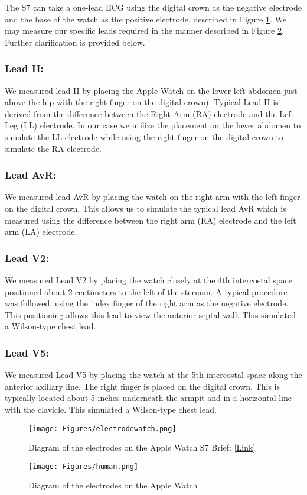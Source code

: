 \documentclass[
	a4paper, 
	10pt, 
	twoside, 
]{LTJournalArticle}
\begin{document}
The S7 can take a one-lead ECG using the digital crown as the negative electrode and the base of the watch as the positive electrode, described in Figure \ref{fig:s7watch}. We may measure our specific leads required in the manner described in Figure \ref{fig:human}. Further clarification is provided below. 

\subsubsection{Lead II:}We measured lead II by placing the Apple Watch on the lower left abdomen just above the hip with the right finger on the digital crown). Typical Lead II is derived from the difference between the Right Arm (RA) electrode and the Left Leg (LL) electrode. In our case we utilize the placement on the lower abdomen to simulate the LL electrode while using the right finger on the digital crown to simulate the RA electrode.

\subsubsection{Lead AvR: }We measured lead AvR by placing the watch on the right arm with the left finger on the digital crown. This allows us to simulate the typical lead AvR which is measured using the difference between the right arm (RA) electrode and the left arm (LA) electrode. 

\subsubsection{Lead V2: }We measured Lead V2 by placing the watch closely at the 4th intercostal space positioned about 2 centimeters to the left of the sternum. A typical procedure was followed, using the index finger of the right arm as the negative electrode. This positioning allows this lead to view the anterior septal wall. This simulated a Wilson-type chest lead. 

\subsubsection{Lead V5: }We measured Lead V5 by placing the watch at the 5th intercostal space along the anterior axillary line. The right finger is placed on the digital crown. This is typically located about 5 inches underneath the armpit and in a horizontal line with the clavicle. This simulated a Wilson-type chest lead. 
\begin{figure}[!h]
    \centering
    \texttt{[image: Figures/electrodewatch.png]}
    \caption{Diagram of the electrodes on the Apple Watch S7 Brief: \href{https://www.macstories.net/linked/the-electrodes-used-by-apples-ecg-watch-app-enable-faster-more-accurate-heart-rate-measurements/}{[Link]}}
    \label{fig:s7watch}
\end{figure}
\begin{figure}[!h]
    \centering
    \texttt{[image: Figures/human.png]}
    \caption{Diagram of the electrodes on the Apple Watch}
    \label{fig:human}
\end{figure}
\end{document}
